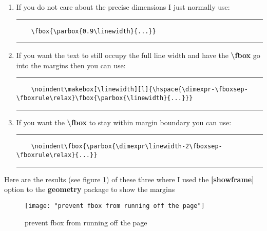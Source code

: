 \begin{enumerate}
	\item If you do not care about the precise dimensions I just normally use:
	
	\noindent\vspace{1em}\hrule
	\begin{verbatim}
	\fbox{\parbox{0.9\linewidth}{...}}
	\end{verbatim}
	\noindent\hrule\vspace{1em}
	
	\item If you want the text to still occupy the full line width and have the \textbf{\textbackslash fbox} go into the margins then you can use:
	
	\noindent\vspace{1em}\hrule
	\begin{verbatim}
	\noindent\makebox[\linewidth][l]{\hspace{\dimexpr-\fboxsep-\fboxrule\relax}\fbox{\parbox{\linewidth}{...}}}
	\end{verbatim}
	\noindent\hrule\vspace{1em}
	
	\item If you want the \textbf{\textbackslash fbox} to stay within margin boundary you can use:
	
	\noindent\vspace{1em}\hrule
	\begin{verbatim}
	\noindent\fbox{\parbox{\dimexpr\linewidth-2\fboxsep-\fboxrule\relax}{...}}
	\end{verbatim}
	\noindent\hrule\vspace{1em}
	
\end{enumerate}

Here are the results (see figure \ref{fig:prevent fbox from running off the page}) of these three where I used the \textbf{[showframe]} option to the \textbf{geometry} package to show the margins 

	\begin{figure}[htb]
		\centering
		\texttt{[image: "prevent fbox from running off the page"]}
		\caption{prevent fbox from running off the page}\label{fig:prevent fbox from running off the page}
	\end{figure}